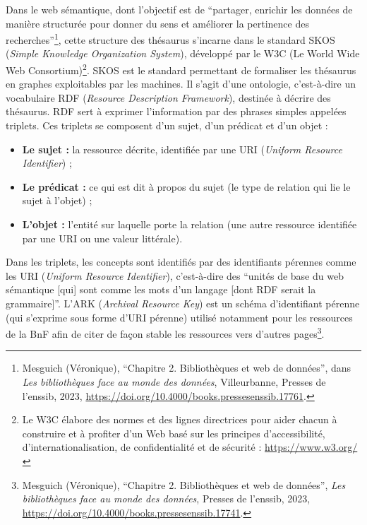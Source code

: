 Dans le web sémantique, dont l’objectif est de \enquote{partager, enrichir les données de manière structurée pour donner du sens et améliorer la pertinence des recherches}\footnote{Mesguich (Véronique), \enquote{Chapitre 2. Bibliothèques et web de données}, dans \textit{Les bibliothèques face au monde des données}, Villeurbanne, Presses de l’enssib, 2023, \url{https://doi.org/10.4000/books.pressesenssib.17761}.}, cette structure des thésaurus s’incarne dans le standard SKOS (\textit{Simple Knowledge Organization System}), développé par le W3C (Le World Wide Web Consortium)\footnote{Le W3C élabore des normes et des lignes directrices pour aider chacun à construire et à profiter d’un Web basé sur les principes d’accessibilité, d’internationalisation, de confidentialité et de sécurité : \url{https://www.w3.org/}}. SKOS est le standard permettant de formaliser les thésaurus en graphes exploitables par les machines. Il s’agit d'une ontologie, c’est-à-dire un vocabulaire RDF (\textit{Resource Description Framework}), destinée à décrire des thésaurus. RDF sert à exprimer l’information par des phrases simples appelées triplets. Ces triplets se composent d’un sujet, d’un prédicat et d’un objet :

\begin{itemize}
	\item \textbf{Le sujet :} la ressource décrite, identifiée par une URI (\textit{Uniform Resource Identifier}) ;
	\item \textbf{Le prédicat :} ce qui est dit à propos du sujet (le type de relation qui lie le sujet à l'objet) ;
	\item \textbf{L'objet :} l'entité sur laquelle porte la relation (une autre ressource identifiée par une URI ou une valeur littérale).
\end{itemize}

Dans les triplets, les concepts sont identifiés par des identifiants pérennes comme les URI (\textit{Uniform Resource Identifier}), c'est-à-dire des \enquote{unités de base du web sémantique [qui] sont comme les mots d’un langage [dont RDF serait la grammaire]}. L'ARK (\textit{Archival Resource Key}) est un schéma d'identifiant pérenne (qui s'exprime sous forme d'URI pérenne) utilisé notamment pour les ressources de la BnF afin de citer de façon stable les ressources vers d'autres pages\footnote{Mesguich (Véronique), \enquote{Chapitre 2. Bibliothèques et web de données}, \textit{Les bibliothèques face au monde des données}, Presses de l’enssib, 2023, \url{https://doi.org/10.4000/books.pressesenssib.17741}.}.


